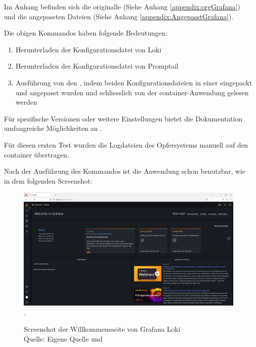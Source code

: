 Im Anhang befinden sich die originalle (Siehe Anhang \ref{appendix:orgGrafana}) und die angepassten Dateien (Siehe Anhang \ref{appendix:AngepasstGrafana}).

Die obigen Kommandos haben folgende Bedeutungen:
\begin{enumerate}[noitemsep]
   \item Herunterladen der Konfigurationsdatei von Loki
   \item Herunterladen der Konfigurationsdatei von Promptail
   \item Ausführung von den , indem beiden Konfigurationsdateien in einer eingepackt und angepasst wurden und schliesslich von der \gls{container}-Anwendung gelesen werden
\end{enumerate}

Für spezifische Versionen oder weitere Einstellungen bietet die Dokumentation umfangreiche Möglichkeiten an \citep{GrafanaLoki_run}.

Für diesen ersten Test wurden die Logdateien des Opfersystems manuell auf den \gls{container} übertragen.

\newpage
\thispagestyle{lscape}
\begin{landscape}
   Nach der Ausführung des Kommandos ist die Anwendung schon benutzbar, wie in dem folgenden Screenshot:
   \begin{center}
      \begin{figure}[H]
         \centering
         \includegraphics[width=1.3\textwidth]{assets/Installation_Grafana.png}.
         \caption{Screenshot der Willkommensseite von Grafana Loki\\Quelle: Eigene Quelle und \citep{Grafana_Logs}}
         \centering
      \end{figure}
   \end{center}
\end{landscape}

